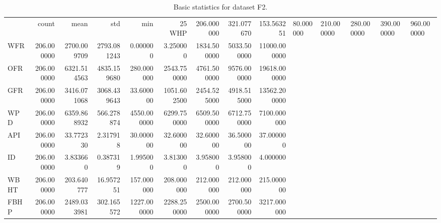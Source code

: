 \begin{table}
\caption{Basic statistics for dataset F2.}
\begin{tabular}{lrrrrrrrr}
\toprule
 & count & mean & std & min & 25%
\midrule
WHP & 206.000000 & 321.077670 & 153.563251 & 80.000000 & 210.000000 & 280.000000 & 390.000000 & 960.000000 \\
WFR & 206.000000 & 2700.009709 & 2793.081243 & 0.000000 & 3.250000 & 1834.500000 & 5033.500000 & 11000.000000 \\
OFR & 206.000000 & 6321.514563 & 4835.159680 & 280.000000 & 2543.750000 & 4761.500000 & 9576.000000 & 19618.000000 \\
GFR & 206.000000 & 3416.071068 & 3068.439643 & 33.600000 & 1051.602500 & 2454.525000 & 4918.515000 & 13562.200000 \\
WPD & 206.000000 & 6359.868932 & 566.278874 & 4550.000000 & 6299.750000 & 6509.500000 & 6712.750000 & 7100.000000 \\
API & 206.000000 & 33.772330 & 2.317918 & 30.000000 & 32.600000 & 32.600000 & 36.500000 & 37.000000 \\
ID & 206.000000 & 3.833660 & 0.387319 & 1.995000 & 3.813000 & 3.958000 & 3.958000 & 4.000000 \\
WBHT & 206.000000 & 203.640777 & 16.957251 & 157.000000 & 208.000000 & 212.000000 & 212.000000 & 215.000000 \\
FBHP & 206.000000 & 2489.033981 & 302.165572 & 1227.000000 & 2288.250000 & 2500.000000 & 2700.500000 & 3217.000000 \\
\bottomrule
\end{tabular}
\end{table}
